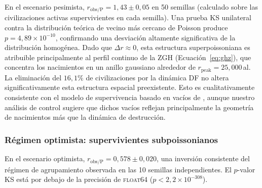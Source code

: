 \documentclass[11pt,a4paper,onecolumn]{article}
\begin{document}
\begin{table}[h]
En el escenario pesimista, $r_\text{obs/P} = 1{,}43 \pm 0{,}05$
en 50 semillas (calculado sobre las civilizaciones activas
supervivientes en cada semilla).
Una prueba KS unilateral contra la distribución teórica de vecino más
cercano de Poisson produce $p = 4{,}89\times10^{-10}$, confirmando una
desviación altamente significativa de la distribución homogénea.
Dado que $\Delta r \approx 0$, esta estructura superpoissoniana es
atribuible principalmente al perfil continuo de la ZGH
(Ecuación~\ref{eq:ghz}), que concentra los nacimientos en un anillo
gaussiano alrededor de $r_\text{peak} = 25{,}000$\,al.
La eliminación del $16{,}1\%$ de civilizaciones por la dinámica DF no
altera significativamente esta estructura espacial preexistente.
Esto es cualitativamente consistente con el modelo de supervivencia
basado en vacíos de \citet{forgan2011}, aunque nuestro análisis de
control sugiere que dichos vacíos reflejan principalmente la geometría de
nacimientos más que la dinámica de destrucción.

\subsubsection{Régimen optimista: supervivientes subpoissonianos}
\label{sec:inversion}

En el escenario optimista, $r_\text{obs/P} = 0{,}578 \pm 0{,}020$,
una inversión consistente del régimen de agrupamiento observada en las
10 semillas independientes.
El $p$-valor KS está por debajo de la precisión de \textsc{float64}
($p < 2{,}2\times10^{-308}$).


\end{table}
\end{document}
